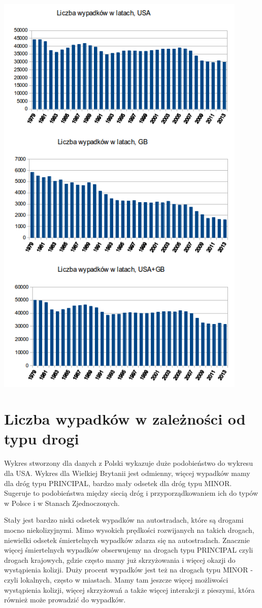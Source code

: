 \centerline{\includegraphics[width=0.9\textwidth]{images/statistics/year.png}}

\section{Liczba wypadków w zależności od typu drogi}

Wykres stworzony dla danych z Polski wykazuje duże podobieństwo do wykresu dla USA. Wykres dla Wielkiej Brytanii jest odmienny, więcej wypadków mamy dla dróg typu PRINCIPAL, bardzo mały odsetek dla dróg typu MINOR. Sugeruje to podobieństwa między siecią dróg i przyporządkowaniem ich do typów w Polsce i w Stanach Zjednoczonych.

Stały jest bardzo niski odsetek wypadków na autostradach, które są drogami mocno niekolizyjnymi. Mimo wysokich prędkości rozwijanych na takich drogach, niewielki odsetek śmiertelnych wypadków zdarza się na autostradach. Znacznie więcej śmiertelnych wypadków obserwujemy na drogach typu PRINCIPAL czyli drogach krajowych, gdzie często mamy już skrzyżowania i więcej okazji do wystąpienia kolizji. Duży procent wypadków jest też na drogach typu MINOR - czyli lokalnych, często w miastach. Mamy tam jeszcze więcej możliwości wystąpienia kolizji, więcej skrzyżowań a także więcej interakcji z pieszymi, która również może prowadzić do wypadków. \\
\\
\\


